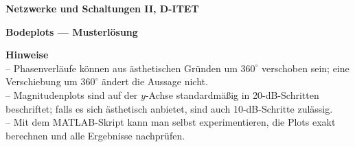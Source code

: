 \documentclass[a4paper,12pt]{article}
\begin{document}
\begin{titlepage}
\thispagestyle{firstpage}
\vspace*{4cm}
\begin{center}
{\Large\bfseries Netzwerke und Schaltungen II, D-ITET\par}
\vspace{3mm}
{\Huge\bfseries Bodeplots — Musterlösung\par}
\vspace{9mm}
\end{center}
\vfill
\begingroup\footnotesize
\textbf{Hinweise}\\[2pt]
– Phasenverläufe können aus ästhetischen Gründen um $360^\circ$ verschoben sein; eine Verschiebung um $360^\circ$ ändert die Aussage nicht.\\
– Magnitudenplots sind auf der $y$-Achse standardmäßig in 20-dB-Schritten beschriftet; falls es sich ästhetisch anbietet, sind auch 10-dB-Schritte zulässig.\\
– Mit dem MATLAB-Skript kann man selbst experimentieren, die Plots exakt berechnen und alle Ergebnisse nachprüfen.
\endgroup
\vfill
\end{titlepage}







 













\end{document}
